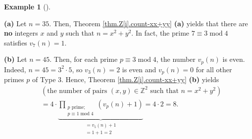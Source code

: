 \documentclass[numbers=enddot,12pt,final,onecolumn,notitlepage]{scrartcl}%
\numberwithin{exer}{subsection}
\theoremstyle{definition}
\newtheorem{exam}[theo]{Example}
\newenvironment{example}[1][]
{\begin{exam}[#1]\begin{leftbar}}
{\end{leftbar}\end{exam}}
\let\prodnonlimits\prod
\renewcommand{\prod}{\prodnonlimits\limits}
\begin{document}
\begin{example}
\textbf{(a)} Let $n=35$. Then, Theorem \ref{thm.Z[i].count-xx+yy} \textbf{(a)}
yields that there are \textbf{no} integers $x$ and $y$ such that
$n=x^{2}+y^{2}$. In fact, the prime $7\equiv3\operatorname{mod}4$ satisfies
$v_{7}\left(  n\right)  =1$.

\textbf{(b)} Let $n=45$. Then, for each prime $p\equiv3\operatorname{mod}4$,
the number $v_{p}\left(  n\right)  $ is even. Indeed, $n=45=3^{2}\cdot5$, so
$v_{3}\left(  n\right)  =2$ is even and $v_{p}\left(  n\right)  =0$ for all
other primes $p$ of Type 3. Hence, Theorem \ref{thm.Z[i].count-xx+yy}
\textbf{(b)} yields%
\begin{align*}
&  \left(  \text{the number of pairs }\left(  x,y\right)  \in\mathbb{Z}%
^{2}\text{ such that }n=x^{2}+y^{2}\right) \\
&  =4\cdot\underbrace{\prod_{\substack{p\text{ prime;}\\p\equiv
1\operatorname{mod}4}}\left(  v_{p}\left(  n\right)  +1\right)  }%
_{\substack{=v_{5}\left(  n\right)  +1\\=1+1=2}}=4\cdot2=8.
\end{align*}

\end{example}
\end{document}
